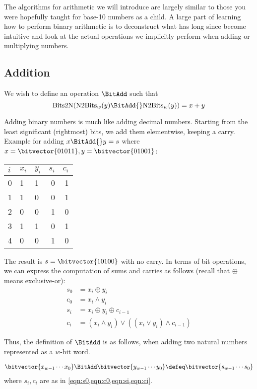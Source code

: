 The algorithms for arithmetic we will introduce are largely similar to
those you were hopefully taught for base-10 numbers as a child.  A
large part of learning how to perform binary arithmetic is to
deconstruct what has long since become intuitive and look at the
actual operations we implicitly perform when adding or multiplying
numbers.

\subsection{Addition}
\label{sec:bit-addition}

We wish to define an operation $\BitAdd$ such that
\begin{equation}
  \mathrm{Bits2N}(\mathrm{N2Bits}_{w}(y)\BitAdd{}\mathrm{N2Bits}_{w}(y)) = x + y
\end{equation}

Adding binary numbers is much like adding decimal numbers.  Starting
from the least significant (rightmost) bits, we add them elementwise,
keeping a carry.  Example for adding $x\BitAdd{} y=s$ where
$x=\bitvector{01011}, y=\bitvector{01001}$:

\begin{center}
\begin{tabular}{l|llrr}
  $i$ & $x_{i}$ & $y_{i}$ & $s_{i}$ & $c_{i}$ \\\midrule
  0 & 1 & 1 & 0 & 1 \\
  1 & 1 & 0 & 0 & 1 \\
  2 & 0 & 0 & 1 & 0 \\
  3 & 1 & 1 & 0 & 1 \\
  4 & 0 & 0 & 1 & 0
\end{tabular}
\end{center}

The result is $s=\bitvector{10100}$ with no carry.  In terms of bit
operations, we can express the computation of sums and carries as
follows (recall that $\oplus$ means exclusive-or):
\begin{align}
  s_{0} &= x_{i} \oplus y_{i} \label{eqn:s0} \\
  c_{0} &= x_{i} \land y_{i} \label{eqn:c0} \\
  s_{i} &= x_{i} \oplus y_{i} \oplus c_{i-1} \label{eqn:si} \\
  c_{i} &= (x_{i} \land y_{i})\lor ((x_{i}\lor y_{i})\land c_{i-1}) \label{eqn:ci}
\end{align}

Thus, the definition of $\BitAdd$ is as follows, when adding two
natural numbers represented as a $w$-bit word.
\begin{definition}
\begin{align*}
  \bitvector{x_{w-1}\cdots{}x_{0}} \BitAdd \bitvector{y_{w-1}\cdots{}y_{0}} \defeq
  \bitvector{s_{w-1}\cdots{}s_{0}}
\end{align*}
where $s_{i},c_{i}$ are as in \cref{eqn:s0,eqn:c0,eqn:si,eqn:ci}.
\label{def:intadd}
\end{definition}

